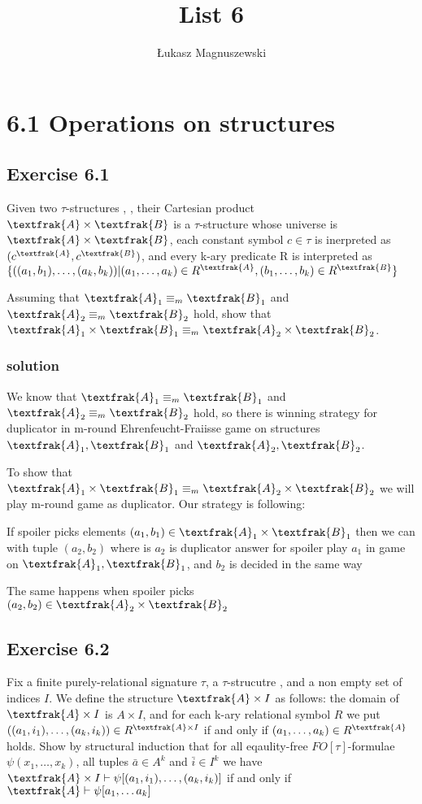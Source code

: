 \documentclass{article}
\title{List 6}
\author{Łukasz Magnuszewski}
\newcommand{\G}[1]{\textfrak{#1}}
\newcommand{\ga}{\textfrak{A}}
\newcommand{\gb}{\textfrak{B}}
\begin{document}
\maketitle
\section*{6.1 Operations on structures}



\subsection*{Exercise 6.1}
Given two $\tau$-structures \G{A}, \G{B}, their Cartesian product $\ga \times \gb$ is a $\tau$-structure whose universe is $\ga \times \gb$, 
each constant symbol $c \in \tau$ is inerpreted as $(c^\ga, c^\gb)$,
and every k-ary predicate R is interpreted as 
$\{((a_1,b_1), \ldots, (a_k, b_k)) | (a_1, \ldots, a_k) \in R^\ga, (b_1, \ldots, b_k) \in R^\gb \}$ 

Assuming that $\ga_1 \equiv_m \gb_1$ and $\ga_2 \equiv_m \gb_2$ hold, 
show that $\ga_1 \times \gb_1 \equiv_m \ga_2 \times \gb_2$.

\subsubsection*{solution}

We know that $\ga_1 \equiv_m \gb_1$ and $\ga_2 \equiv_m \gb_2$ hold, so there is winning strategy
for duplicator in m-round Ehrenfeucht-Fraiisse game on structures $\ga_1, \gb_1$ and $\ga_2, \gb_2$. 

To show that $\ga_1 \times \gb_1 \equiv_m \ga_2 \times \gb_2$ we will play m-round game as duplicator. Our strategy is following:
 

  If spoiler picks elements  $(a_1,b_1) \in \ga_1 \times \gb_1$ then we can with tuple $(a_2, b_2)$
  where is $a_2$ is duplicator answer for spoiler play $a_1$ in game on $\ga_1, \gb_1$, and $b_2$ is decided in the same way

The same happens when spoiler picks $(a_2, b_2) \in \ga_2 \times \gb_2$


\subsection*{Exercise 6.2}
Fix a finite purely-relational signature $\tau$, a $\tau$-strucutre \ga, and a non empty set of indices $I$.
We define the structure $\ga \times I$ as follows: the domain of $\ga \times I$ is $A \times I$,
and for each k-ary relational symbol $R$ we put 
$((a_1,i_1), \ldots, (a_k, i_k)) \in R^{\ga \times I} $
if and only if $(a_1, \ldots, a_k) \in R^\ga$ holds.
Show by structural induction that for all eqaulity-free $FO[\tau]$-formulae $\psi(x_1, \ldots, x_k)$,
all tuples $\bar{a} \in A^k$ and $\bar{i} \in I^k$ we have 
$\ga \times I \vdash \psi[(a_1, i_1), \ldots, (a_k, i_k)]$ if and only if $\ga \vdash \psi[a_1, \ldots a_k]$
\end{document}

